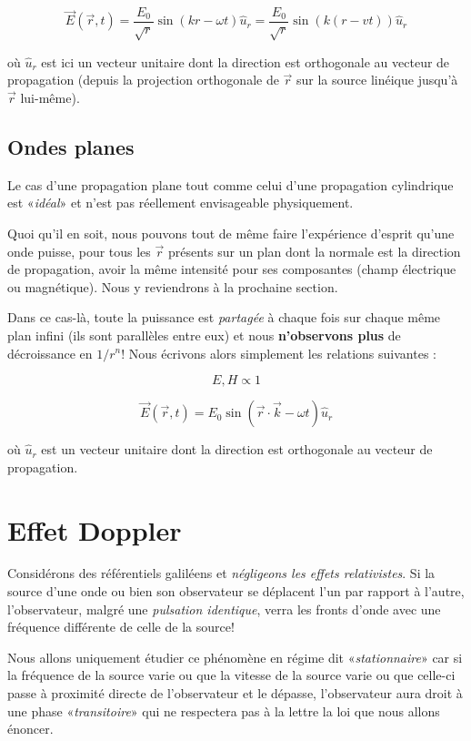 \[\vec{E}(\vec{r},t) = \frac{E_{0}}{\sqrt{r}} \sin(kr - \omega t) \hat{u}_{r} = \frac{E_{0}}{\sqrt{r}} \sin(k(r - v t)) \hat{u}_{r}\]

où $\hat{u}_{r}$ est ici un vecteur unitaire dont la direction est orthogonale au vecteur de propagation (depuis la projection orthogonale de $\vec{r}$ sur la source linéique jusqu'à $\vec{r}$ lui-même).


\subsection{Ondes planes} 

Le cas d'une propagation plane tout comme celui d'une propagation cylindrique est «\textit{idéal}» et n'est pas réellement envisageable physiquement.

Quoi qu'il en soit, nous pouvons tout de même faire l'expérience d'esprit qu'une onde puisse, pour tous les $\vec{r}$ présents sur un plan dont la normale est la direction 
de propagation, avoir la même intensité pour ses composantes (champ électrique ou magnétique). Nous y reviendrons à la prochaine section.

Dans ce cas-là, toute la puissance est \textit{partagée} à chaque fois sur chaque même plan infini (ils sont parallèles entre eux) et nous \textbf{n'observons plus} de décroissance 
en $1/r^{n}$! Nous écrivons alors simplement les relations suivantes : 

\[E,H \propto 1\]

\[\vec{E}(\vec{r},t) = E_{0} \sin(\vec{r}\cdot \vec{k}-\omega t) \hat{u}_{r}\]

où $\hat{u}_{r}$ est un vecteur unitaire dont la direction est orthogonale au vecteur de propagation.

\section{Effet Doppler}

Considérons des référentiels galiléens et \textit{négligeons les effets relativistes}. 
Si la source d'une onde ou bien son observateur se déplacent l'un par rapport à l'autre, l'observateur, malgré une \textit{pulsation identique}, verra les fronts d'onde avec une fréquence différente de celle de la source!

Nous allons uniquement étudier ce phénomène en régime dit «\textit{stationnaire}» car si la fréquence de la source varie ou que la vitesse de la source varie ou que celle-ci 
passe à proximité directe de l'observateur et le dépasse, l'observateur aura droit à une phase «\textit{transitoire}» qui ne respectera pas à la lettre la loi que nous allons énoncer.

